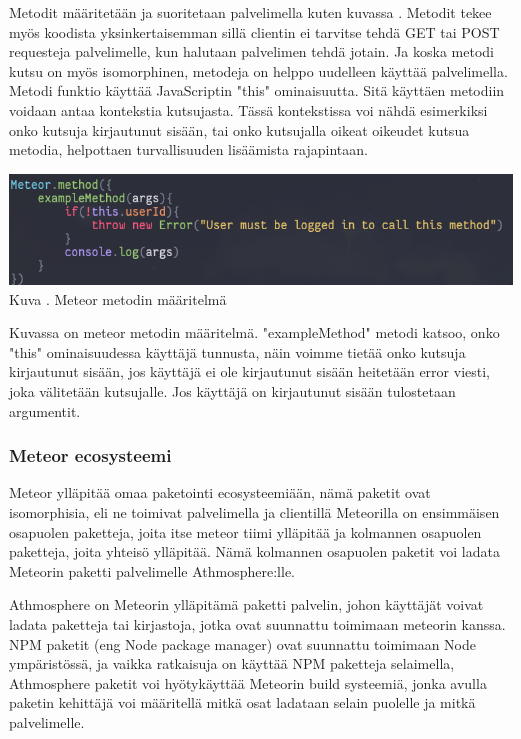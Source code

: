 Metodit määritetään ja suoritetaan palvelimella kuten kuvassa \nextImageCount.
Metodit tekee myös koodista yksinkertaisemman sillä clientin ei tarvitse tehdä GET tai POST requesteja palvelimelle, kun halutaan palvelimen tehdä jotain. 
Ja koska metodi kutsu on myös isomorphinen, metodeja on helppo uudelleen käyttää palvelimella.
Metodi funktio käyttää JavaScriptin "this"{} ominaisuutta. 
Sitä käyttäen metodiin voidaan antaa kontekstia kutsujasta.
Tässä kontekstissa voi nähdä esimerkiksi onko kutsuja kirjautunut sisään, tai onko kutsujalla oikeat oikeudet kutsua metodia, 
helpottaen turvallisuuden lisäämista rajapintaan.
\bigskip

\includegraphics[width=15cm]{src/public/methodexample.png}\\
Kuva \getImgCount {}. Meteor metodin määritelmä
\medskip

Kuvassa on meteor metodin määritelmä. "exampleMethod"{} metodi katsoo, onko "this"{} ominaisuudessa käyttäjä tunnusta, näin voimme tietää onko kutsuja kirjautunut sisään,
jos käyttäjä ei ole kirjautunut sisään heitetään error viesti, joka välitetään kutsujalle.
Jos käyttäjä on kirjautunut sisään tulostetaan argumentit. 
\medskip




\subsubsection{Meteor ecosysteemi}


%


Meteor ylläpitää omaa paketointi ecosysteemiään, nämä
paketit ovat isomorphisia, eli ne toimivat palvelimella ja clientillä 
Meteorilla on ensimmäisen osapuolen paketteja, joita itse meteor tiimi ylläpitää ja kolmannen osapuolen paketteja,
joita yhteisö ylläpitää. Nämä kolmannen osapuolen paketit voi ladata Meteorin paketti palvelimelle Athmosphere:lle. 
\medskip


Athmosphere on Meteorin ylläpitämä paketti palvelin, johon käyttäjät voivat ladata paketteja tai kirjastoja, jotka ovat suunnattu toimimaan meteorin kanssa.
NPM paketit (eng Node package manager) ovat suunnattu toimimaan Node ympäristössä, ja vaikka ratkaisuja on käyttää NPM paketteja selaimella, 
Athmosphere paketit voi hyötykäyttää Meteorin build systeemiä, jonka avulla paketin kehittäjä voi määritellä mitkä osat ladataan selain puolelle ja mitkä palvelimelle.

